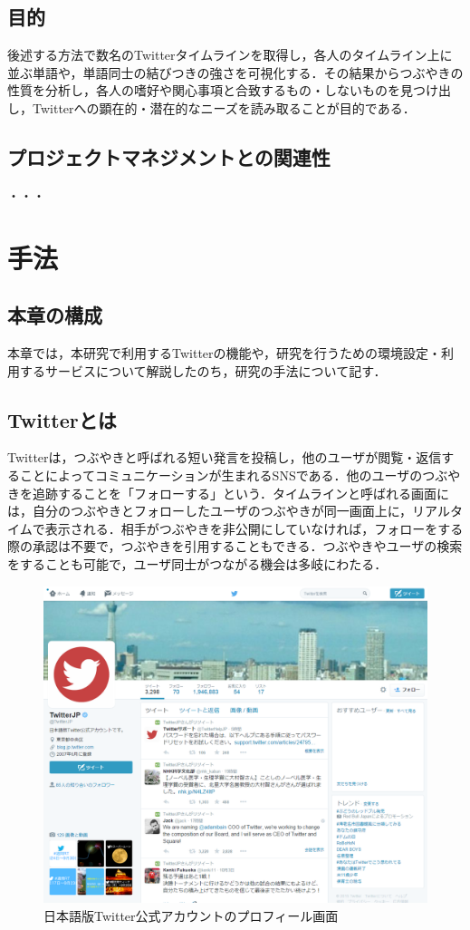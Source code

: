 \section{目的}
後述する方法で数名のTwitterタイムラインを取得し，各人のタイムライン上に並ぶ単語や，単語同士の結びつきの強さを可視化する．その結果からつぶやきの性質を分析し，各人の嗜好や関心事項と合致するもの・しないものを見つけ出し，Twitterへの顕在的・潜在的なニーズを読み取ることが目的である．

\section{プロジェクトマネジメントとの関連性}
・・・

\chapter{手法}

\section{本章の構成}
本章では，本研究で利用するTwitterの機能や，研究を行うための環境設定・利用するサービスについて解説したのち，研究の手法について記す．

\section{Twitterとは}
Twitterは，つぶやきと呼ばれる短い発言を投稿し，他のユーザが閲覧・返信することによってコミュニケーションが生まれるSNSである．他のユーザのつぶやきを追跡することを「フォローする」という．タイムラインと呼ばれる画面には，自分のつぶやきとフォローしたユーザのつぶやきが同一画面上に，リアルタイムで表示される．相手がつぶやきを非公開にしていなければ，フォローをする際の承認は不要で，つぶやきを引用することもできる．つぶやきやユーザの検索をすることも可能で，ユーザ同士がつながる機会は多岐にわたる．

\begin{figure}[H]
\centering
\includegraphics[width=15cm]{TwitterJP.png}
\caption{日本語版Twitter公式アカウントのプロフィール画面}\label{TwitterJP}
\end{figure}


